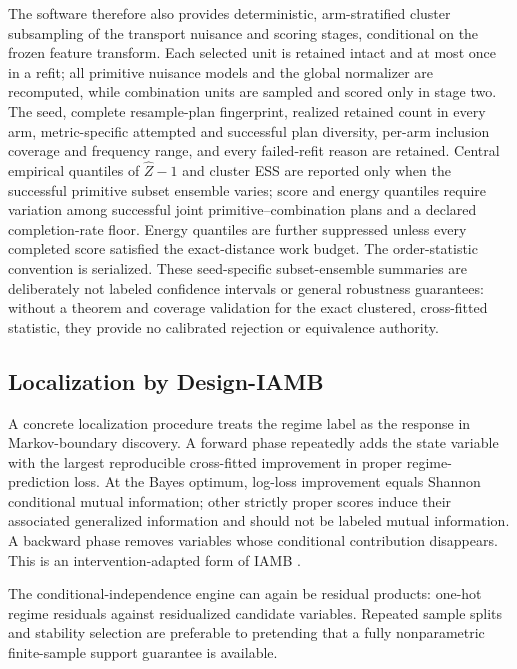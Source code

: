 \documentclass[11pt]{article}
\begin{document}
The software therefore also provides deterministic, arm-stratified cluster subsampling of the transport nuisance and scoring stages, conditional on the frozen feature transform.  Each selected unit is retained intact and at most once in a refit; all primitive nuisance models and the global normalizer are recomputed, while combination units are sampled and scored only in stage two.  The seed, complete resample-plan fingerprint, realized retained count in every arm, metric-specific attempted and successful plan diversity, per-arm inclusion coverage and frequency range, and every failed-refit reason are retained.  Central empirical quantiles of \(\widehat Z-1\) and cluster ESS are reported only when the successful primitive subset ensemble varies; score and energy quantiles require variation among successful joint primitive--combination plans and a declared completion-rate floor.  Energy quantiles are further suppressed unless every completed score satisfied the exact-distance work budget.  The order-statistic convention is serialized.  These seed-specific subset-ensemble summaries are deliberately not labeled confidence intervals or general robustness guarantees: without a theorem and coverage validation for the exact clustered, cross-fitted statistic, they provide no calibrated rejection or equivalence authority.

\subsection{Localization by Design-IAMB}

A concrete localization procedure treats the regime label as the response in Markov-boundary discovery.  A forward phase repeatedly adds the state variable with the largest reproducible cross-fitted improvement in proper regime-prediction loss.  At the Bayes optimum, log-loss improvement equals Shannon conditional mutual information; other strictly proper scores induce their associated generalized information and should not be labeled mutual information.  A backward phase removes variables whose conditional contribution disappears.  This is an intervention-adapted form of IAMB \citep{tsamardinos2003iamb}.

The conditional-independence engine can again be residual products: one-hot regime residuals against residualized candidate variables.  Repeated sample splits and stability selection \citep{meinshausen2010stability} are preferable to pretending that a fully nonparametric finite-sample support guarantee is available.
\end{document}
